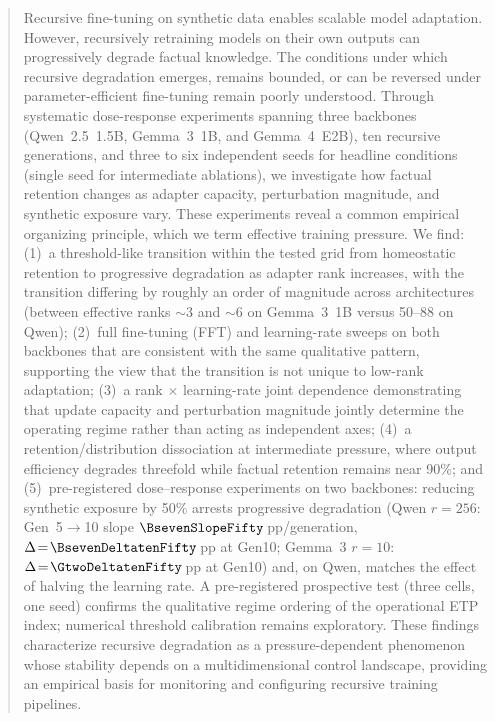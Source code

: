 \documentclass[a4paper,fleqn]{cas-dc}
\newif\ifshowchanges
\newcommand{\rev}[1]{\ifshowchanges{\color{blue}#1}\else{#1}\fi}
\begin{document}
\begin{abstract}
Recursive fine-tuning on synthetic data enables scalable model adaptation.
However, recursively retraining models on their own outputs can progressively
degrade factual knowledge. The conditions under which recursive degradation
emerges, remains bounded, or can be reversed under parameter-efficient
fine-tuning remain poorly understood.
\rev{Through systematic dose-response experiments spanning three backbones
(Qwen~2.5~1.5B, Gemma~3~1B, and Gemma~4~E2B), ten recursive generations,
and three to six independent seeds for headline conditions (single seed for
intermediate ablations), we investigate how factual retention changes as
adapter capacity, perturbation magnitude, and synthetic exposure vary.}
These experiments reveal a common empirical organizing principle, which we
term effective training pressure. We find:
(1)~\rev{a threshold-like transition within the tested grid} from homeostatic
retention to progressive degradation as adapter rank increases, with the
transition differing by roughly an order of magnitude across architectures
(between effective ranks ${\sim}3$ and ${\sim}6$ on Gemma~3~1B versus 50--88 on Qwen);
(2)~\rev{full fine-tuning (FFT) and} learning-rate sweeps on both backbones
that are consistent with the same qualitative pattern, supporting the view
that the transition is not unique to low-rank adaptation;
(3)~a rank $\times$ learning-rate \rev{joint dependence} demonstrating that
update capacity and perturbation magnitude jointly determine the operating
regime rather than acting as independent axes;
(4)~a retention/distribution dissociation at intermediate pressure, where
output efficiency degrades threefold while factual retention remains near 90\%;
and (5)~\rev{pre-registered dose--response experiments on two backbones:
reducing synthetic exposure by 50\% arrests progressive degradation
(Qwen $r=256$: Gen~5$\to$10 slope $\BsevenSlopeFifty$\,pp/generation,
$\Delta\!=\!\BsevenDeltatenFifty$\,pp at Gen10; Gemma~3 $r=10$:
$\Delta\!=\!\GtwoDeltatenFifty$\,pp at Gen10) and, on Qwen, matches the effect
of halving the learning rate.
A pre-registered prospective test (three cells, one seed) confirms the
qualitative regime ordering of the operational ETP index; numerical threshold
calibration remains exploratory.}
These findings characterize recursive degradation as a pressure-dependent
phenomenon whose stability depends on a multidimensional control landscape,
providing an empirical basis for monitoring and configuring recursive training
pipelines.
\end{abstract}
\end{document}
